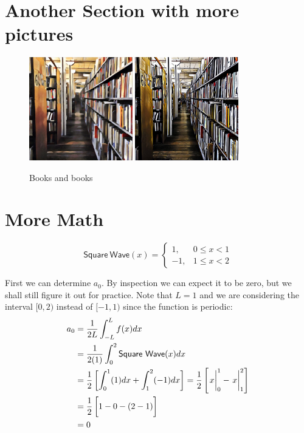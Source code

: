 \documentclass[10pt,letterpaper,twoside,final]{memoir}
\begin{document}
\lipsum[10-11]

\section{Another Section with more pictures}

\lipsum[12]

\begin{figure}
\centering
\includegraphics[width=0.4\textwidth]{BooksPic1}
\qquad
\includegraphics[width=0.4\textwidth]{BooksPic2}
\caption{\label{fig:path}Books and books}
\end{figure}

\lipsum[13-14]

\section{More Math}

\lipsum[15]

\[
\mathsf{Square\ Wave}(x) = \left\{ 
      \begin{array}{ll} 1, & 0 \leq x < 1 \\ 
                       -1, & 1 \leq x < 2 \end{array} \right.
\]

First we can determine $a_0$.  By inspection we can expect it to be zero, but we shall still 
figure it out for practice.  Note that $L = 1$ and we are considering the interval $[0, 2)$ instead
of $[-1, 1)$ since the function is periodic:
\begin{align*}
a_0 &= \frac{1}{2L} \int_{-L}^L f(x) dx  \\
    &= \frac{1}{2(1)} \int_{0}^{2} \mathsf{Square\ Wave}(x) dx \\
    &= \frac{1}{2} \left[ \int_0^1 (1) dx + \int_1^2 (-1) dx \right] = \frac{1}{2} \left[ \left. \vphantom{\frac{1}{2}} x\right|^1_0 - \left. \vphantom{\frac{1}{2}} x\right|^2_1 \right] \\
    &= \frac{1}{2} \left[ \vphantom{\frac{1}{2}} 1 - 0 - (2 - 1) \right] \\
    &= 0
\end{align*}
\end{document}
